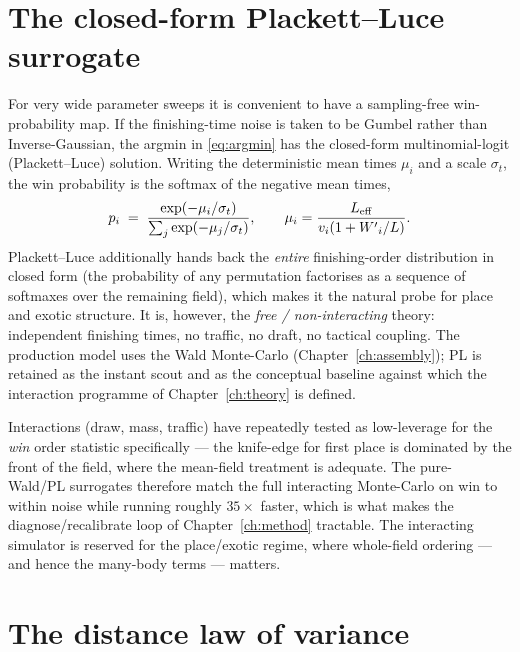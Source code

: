 \section{The closed-form Plackett--Luce surrogate}
\label{sec:pl}

For very wide parameter sweeps it is convenient to have a sampling-free win-probability map. If
the finishing-time noise is taken to be Gumbel rather than Inverse-Gaussian, the argmin in
\eqref{eq:argmin} has the closed-form multinomial-logit (Plackett--Luce) solution. Writing the
deterministic mean times $\mu_i$ and a scale $\sigma_t$, the win probability is the softmax of the
negative mean times,
\begin{equation}
  p_i \;=\; \frac{\exp(-\mu_i/\sigma_t)}{\sum_{j}\exp(-\mu_j/\sigma_t)} ,
  \qquad \mu_i = \frac{{L_{\mathrm{eff}}}}{v_i(1+{W^{\prime}}_i/L)} .
  \label{eq:pl}
\end{equation}
Plackett--Luce additionally hands back the \emph{entire} finishing-order distribution in closed
form (the probability of any permutation factorises as a sequence of softmaxes over the remaining
field), which makes it the natural probe for place and exotic structure. It is, however, the
\emph{free / non-interacting} theory: independent finishing times, no traffic, no draft, no
tactical coupling. The production model uses the Wald Monte-Carlo (Chapter~\ref{ch:assembly}); PL
is retained as the instant scout and as the conceptual baseline against which the interaction
programme of Chapter~\ref{ch:theory} is defined.

\begin{remark}
Interactions (draw, mass, traffic) have repeatedly tested as low-leverage for the \emph{win}
order statistic specifically --- the knife-edge for first place is dominated by the front of the
field, where the mean-field treatment is adequate. The pure- Wald/PL surrogates
therefore match the full interacting Monte-Carlo on win to within noise while running roughly
$35\times$ faster, which is what makes the diagnose/recalibrate loop of Chapter~\ref{ch:method}
tractable. The interacting simulator is reserved for the place/exotic regime, where whole-field
ordering --- and hence the many-body terms --- matters.
\end{remark}

\section{The distance law of variance}
\label{sec:cvlaw}

